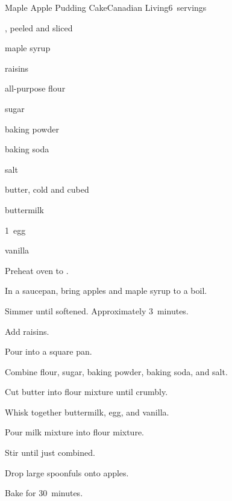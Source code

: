 \begin{recipe}{Maple Apple Pudding Cake}{Canadian Living}{6~servings}

\begin{ingredients}
\item {} , peeled and sliced
\item \C{\twothird} maple syrup
\item \C{\third} raisins
\item {} all-purpose flour
\item \C{\quarter} sugar
\item \tp{1\half} baking powder
\item \tp{\half} baking soda
\item \tp{\quarter} salt
\item \C{\quarter} butter, cold and cubed
\item \C{\half} buttermilk
\item 1~egg
\item {} vanilla
\end{ingredients}

\begin{directions}
\item Preheat oven to .
\item In a saucepan, bring apples and maple syrup to a boil.
\item Simmer until softened. Approximately 3~minutes.
\item Add raisins.
\item Pour into a  square pan.
\item Combine flour, sugar, baking powder, baking soda, and salt.
\item Cut butter into flour mixture until crumbly.
\item Whisk together buttermilk, egg, and vanilla.
\item Pour milk mixture into flour mixture.
\item Stir until just combined.
\item Drop large spoonfuls onto apples.
\item Bake for 30~minutes.
\end{directions}

\end{recipe}
